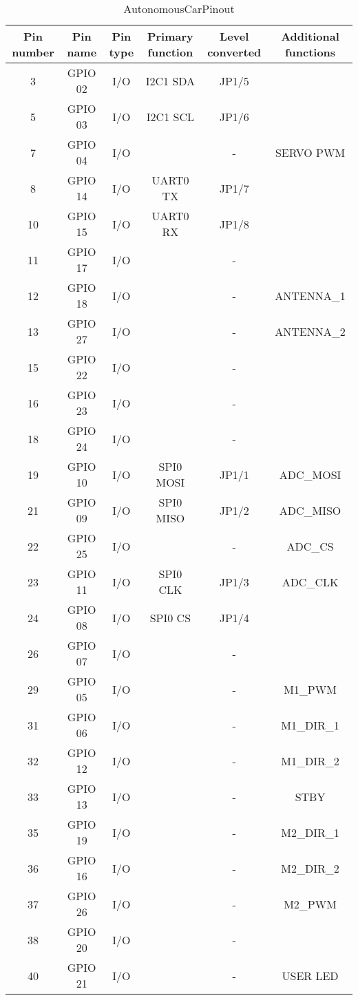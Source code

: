 \begin{table}[htbp]
\caption{AutonomousCarPinout}
\begin{center}
\begin{tabular}{|c|c|c|c|c|c|}
\hline
\textbf{Pin number} & \textbf{Pin name} & \textbf{Pin type} & \textbf{Primary function} & \textbf{Level converted} & \textbf{Additional functions} \\ \hline
3 & GPIO 02 & I/O & I2C1 SDA  & JP1/5 &  \\ \hline
5 & GPIO 03 & I/O & I2C1 SCL  & JP1/6 &  \\ \hline
7 & GPIO 04 & I/O &  & - & SERVO PWM \\ \hline
8 & GPIO 14 & I/O & UART0 TX & JP1/7 &  \\ \hline
10 & GPIO 15 & I/O & UART0 RX & JP1/8 &  \\ \hline
11 & GPIO 17 & I/O &  & - &  \\ \hline
12 & GPIO 18 & I/O &  & - & ANTENNA\_1 \\ \hline
13 & GPIO 27 & I/O &  & - & ANTENNA\_2 \\ \hline
15 & GPIO 22 & I/O &  & - &  \\ \hline
16 & GPIO 23 & I/O &  & - &  \\ \hline
18 & GPIO 24 & I/O &  & - &  \\ \hline
19 & GPIO 10 & I/O & SPI0 MOSI & JP1/1 & ADC\_MOSI \\ \hline
21 & GPIO 09 & I/O & SPI0 MISO & JP1/2 & ADC\_MISO \\ \hline
22 & GPIO 25 & I/O &  & - & ADC\_CS \\ \hline
23 & GPIO 11 & I/O & SPI0 CLK & JP1/3 & ADC\_CLK \\ \hline
24 & GPIO 08 & I/O & SPI0 CS & JP1/4 &  \\ \hline
26 & GPIO 07 & I/O &  & - &  \\ \hline
29 & GPIO 05 & I/O &  & - & M1\_PWM \\ \hline
31 & GPIO 06 & I/O &  & - & M1\_DIR\_1 \\ \hline
32 & GPIO 12 & I/O &  & - & M1\_DIR\_2 \\ \hline
33 & GPIO 13 & I/O &  & - & STBY \\ \hline
35 & GPIO 19 & I/O &  & - & M2\_DIR\_1 \\ \hline
36 & GPIO 16 & I/O &  & - & M2\_DIR\_2 \\ \hline
37 & GPIO 26 & I/O &  & - & M2\_PWM \\ \hline
38 & GPIO 20 & I/O &  & - &  \\ \hline
40 & GPIO 21 & I/O & \multicolumn{1}{l|}{} & - & USER LED \\ \hline
\end{tabular}
\end{center}
\label{AutonomousCarPinout}
\end{table}
